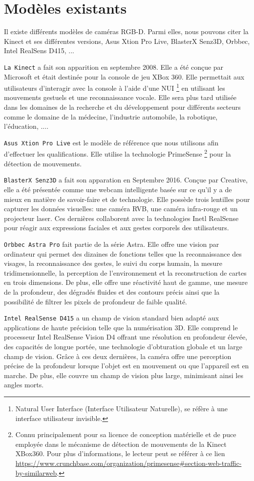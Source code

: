 \documentclass[a4paper, 12pt]{book}
\begin{document}
\section{Modèles existants}
Il existe différents modèles de caméras RGB-D. Parmi elles, nous pouvons citer la Kinect et ses différentes versions, Asus Xtion Pro Live, BlasterX Senz3D, Orbbec, Intel RealSens D415, ...
\par \texttt{La Kinect} a fait son apparition en septembre 2008. Elle a été conçue par Microsoft et était destinée pour la console de jeu XBox 360. Elle permettait aux utilisateurs d'interagir avec la console à l'aide d'une NUI \footnote{Natural User Interface (Interface Utilisateur Naturelle), se réfère à une interface utilisateur invisible.} en utilisant les mouvements gestuels et une reconnaissance vocale. Elle sera plus tard utilisée dans les domaines de la  recherche et du développement pour différents secteurs comme le domaine de la médecine, l'industrie automobile, la robotique, l'éducation,  .... 
\par \texttt{Asus Xtion Pro Live} est le modèle de référence que nous utilisons afin d'effectuer les qualifications. Elle utilise la technologie PrimeSense  \footnote{Connu principalement pour sa licence de conception matérielle et de puce employée dans le mécanisme de détection de mouvements de la Kinect XBox360. Pour plus d'informations, le lecteur peut se référer à ce lien \url{https://www.crunchbase.com/organization/primesense#section-web-traffic-by-similarweb}.} pour la détection de mouvements.
\par \texttt{BlasterX Senz3D} a fait son apparation en Septembre 2016. Conçue par Creative,  elle a été présentée comme une webcam intelligente basée sur ce qu'il y a de mieux en matière de savoir-faire et de technologie. Elle possède trois lentilles pour capturer les données visuelles: une caméra RVB, une caméra infra-rouge et un projecteur laser. Ces dernières collaborent avec la technologies Inetl RealSense pour réagir aux expressions faciales et aux gestes corporels des utilisateurs.
\par \texttt{Orbbec Astra Pro} fait partie de la série Astra. Elle offre une vision par ordinateur qui permet des dizaines de fonctions telles que la reconnaissance des visages, la reconnaissance des gestes, le suivi du corps humain, la mesure tridimensionnelle, la perception de l'environnement et la reconstruction de cartes en trois dimensions. De plus, elle offre une réactivité haut de gamme, une mesure de la profondeur, des dégradés fluides et des contours précis ainsi que la possibilité de filtrer les pixels de profondeur de faible qualité.
\par \texttt{Intel RealSense D415} a un champ de vision standard bien adapté aux applications de haute précision telle que la numérisation 3D. Elle comprend le processeur Intel RealSense Vision D4 offrant une résolution en profondeur élevée, des capacités de longue portée, une technologie d'obturation globale et un large champ de vision. Grâce à ces deux dernières, la caméra offre une perception précise de la profondeur lorsque l'objet est en mouvement ou que l'appareil est en marche. De plus, elle couvre un champ de vision plus large, minimisant ainsi les angles morts.
\end{document}
